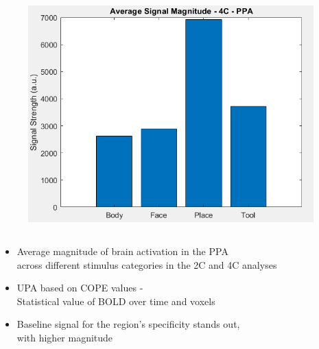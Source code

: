 \begin{frame}
\begin{columns}
		\begin{column}{0.49\textwidth}
			\begin{figure}
				\centering
				\includegraphics[width=0.98\textwidth]{assets/upa_4C_ppa.png}
			\end{figure}
		\end{column}
	\end{columns}	
	\begin{itemize}
		\item Average magnitude of brain activation in the PPA\\across different stimulus categories in the 2C and 4C analyses
		\item UPA based on COPE values -\\Statistical value of BOLD over time and voxels
		\item Baseline signal for the region's specificity stands out,\\with higher magnitude
	\end{itemize}
\end{frame}


